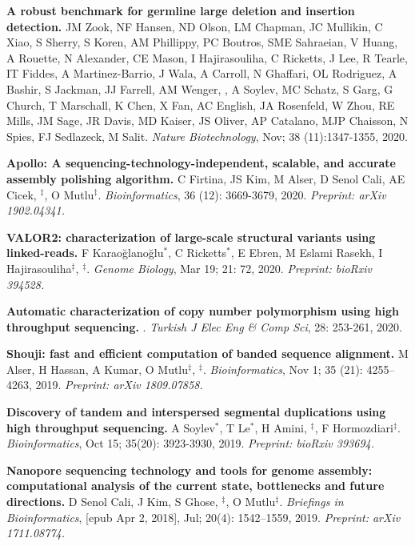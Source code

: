 \vspace{-.2cm}
    {\bf A robust benchmark for germline large deletion and insertion detection.}
    JM Zook, NF Hansen, ND Olson, LM Chapman, JC Mullikin, C Xiao, S Sherry, S Koren, AM Phillippy, PC Boutros, SME Sahraeian, V Huang, A Rouette, N Alexander, CE Mason, I Hajirasouliha, C Ricketts, J Lee, R Tearle, IT Fiddes, A Martinez-Barrio, J Wala, A Carroll, N Ghaffari, OL Rodriguez, A Bashir, S Jackman, JJ Farrell, AM Wenger, \calkan{}, A Soylev, MC Schatz, S Garg, G Church, T Marschall, K Chen, X Fan, AC English, JA Rosenfeld, W Zhou, RE Mills, JM Sage, JR Davis, MD Kaiser, JS Oliver, AP Catalano, MJP Chaisson, N Spies, FJ Sedlazeck, M Salit.
    {\it Nature Biotechnology}, Nov;  38 (11):1347-1355, 2020.
 
\vspace{-.2cm}
    {\bf Apollo: A sequencing-technology-independent, scalable, and accurate assembly polishing algorithm.} C Firtina, JS Kim, M Alser, D Senol Cali, AE Cicek, \calkan{}$^\ddag$, O Mutlu$^\ddag$. {\it Bioinformatics}, 36 (12): 3669-3679, 2020.
    \textit{Preprint: arXiv 1902.04341.}

\vspace{-.2cm}
    {\bf VALOR2: characterization of large-scale structural variants using linked-reads.}
    F Karaoğlanoğlu$^*$, C Ricketts$^*$, E Ebren, M Eslami Rasekh,  I Hajirasouliha$^\ddag$, \calkan{}$^\ddag$.
    {\it Genome Biology}, Mar 19; 21: 72, 2020.  \textit{Preprint: bioRxiv 394528.}

\vspace{-.2cm}
    {\bf Automatic characterization of copy number polymorphism using high throughput sequencing.}  \calkan{}. {\em Turkish J Elec Eng \& Comp Sci}, 28: 253-261, 2020.
         
\vspace{-.2cm}
    {\bf Shouji: fast and efficient computation of banded sequence alignment.} M Alser, H Hassan, A Kumar, O Mutlu$^\ddag$, \calkan{}$^\ddag$.
    {\it Bioinformatics}, Nov 1; 35 (21): 4255–4263, 2019. \textit{Preprint: arXiv 1809.07858.}

\vspace{-.2cm}
    {\bf Discovery of tandem and interspersed segmental duplications using high throughput sequencing.}
    A Soylev$^*$, T Le$^*$, H Amini, \calkan{}$^\ddag$, F Hormozdiari$^\ddag$.
    {\it Bioinformatics}, Oct 15; 35(20): 3923-3930, 2019. \textit{Preprint: bioRxiv 393694.}       
        
\vspace{-.2cm}
    {\bf Nanopore sequencing technology and tools for genome assembly: computational analysis of the current state, bottlenecks and future directions.}
    D Senol Cali, J Kim, S Ghose, \calkan{}$^\ddag$, O Mutlu$^\ddag$.
    {\em Briefings in Bioinformatics}, [epub Apr 2, 2018], Jul; 20(4): 1542–1559, 2019. \textit{Preprint: arXiv 1711.08774.}

